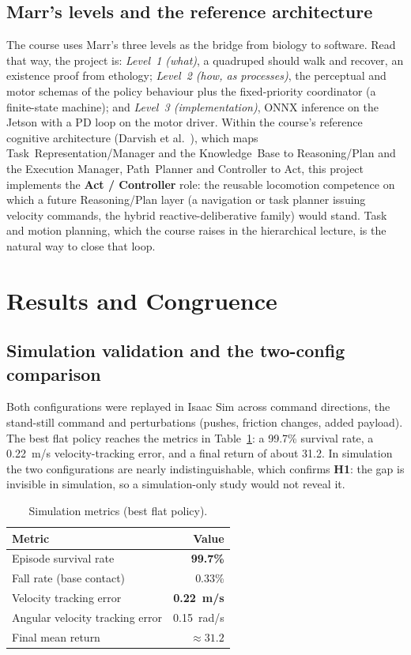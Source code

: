 \documentclass[conference]{IEEEtran}
\begin{document}
\subsection{Marr's levels and the reference architecture}
The course uses Marr's three levels as the bridge from biology to software. Read that way, the
project is: \emph{Level~1 (what)}, a quadruped should walk and recover, an existence proof from
ethology; \emph{Level~2 (how, as processes)}, the perceptual and motor schemas of the policy
behaviour plus the fixed-priority coordinator (a finite-state machine); and \emph{Level~3
(implementation)}, ONNX inference on the Jetson with a PD loop on the motor driver. Within the
course's reference cognitive architecture (Darvish et al.~\cite{darvish2021}), which maps
Task~Representation/Manager and the Knowledge~Base to Reasoning/Plan and the Execution Manager,
Path~Planner and Controller to Act, this project implements the \textbf{Act / Controller} role:
the reusable locomotion competence on which a future Reasoning/Plan layer (a navigation or task
planner issuing velocity commands, the hybrid reactive-deliberative family) would stand. Task and
motion planning, which the course raises in the hierarchical lecture, is the natural way to close
that loop.

\section{Results and Congruence}
\label{sec:results}

\subsection{Simulation validation and the two-config comparison}
Both configurations were replayed in Isaac Sim across command directions, the stand-still command
and perturbations (pushes, friction changes, added payload). The best flat policy reaches the
metrics in Table~\ref{tab:metrics}: a 99.7\% survival rate, a 0.22~m/s velocity-tracking error,
and a final return of about 31.2. In simulation the two configurations are nearly
indistinguishable, which confirms \textbf{H1}: the gap is invisible in simulation, so a
simulation-only study would not reveal it.

\begin{table}[t]
\caption{Simulation metrics (best flat policy).}
\label{tab:metrics}
\centering
\footnotesize
\begin{tabular}{l r}
\toprule
\textbf{Metric} & \textbf{Value} \\
\midrule
Episode survival rate & \textbf{99.7\%} \\
Fall rate (base contact) & 0.33\% \\
Velocity tracking error & \textbf{0.22~m/s} \\
Angular velocity tracking error & 0.15~rad/s \\
Final mean return & ${\approx}31.2$ \\
\bottomrule
\end{tabular}
\end{table}
\end{document}
